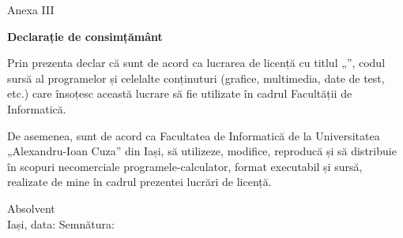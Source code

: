 \vspace*{\fill}

\begin{flushright}
    Anexa III \\
\end{flushright}

\vspace{1cm}
\begin{center}
    \large
    \textbf{Declarație de consimțământ}
\end{center}

Prin prezenta declar că sunt de acord ca lucrarea de licență cu titlul „\textbf{\thesistitle}”, codul sursă al programelor și celelalte 
conținuturi (grafice, multimedia, date de test, etc.) care însoțesc această lucrare să fie utilizate în cadrul Facultății de Informatică.

De asemenea, sunt de acord ca Facultatea de Informatică de la Universitatea „Alexandru-Ioan Cuza” din Iași, să utilizeze, modifice, 
reproducă și să distribuie în scopuri necomerciale programele-calculator, format executabil și sursă, realizate de mine în cadrul 
prezentei lucrări de licență.

\begin{flushright}
    Absolvent \textbf{\authornamefl} \\
    \vspace{0.5cm}
    Iași, data: \dottedline \hspace{5cm} Semnătura: \dottedline
\end{flushright}
\vspace*{\fill}
\pagebreak